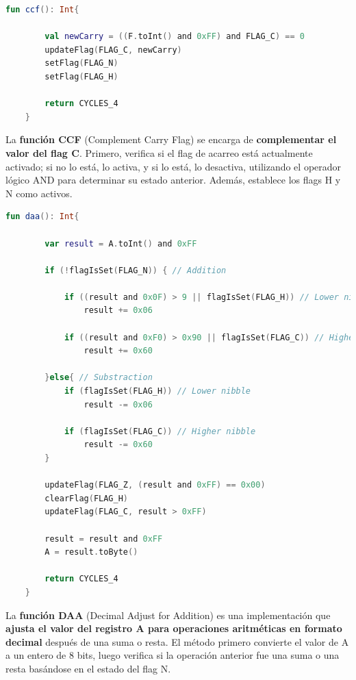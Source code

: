 \begin{lstlisting}[language=Kotlin, caption={Operación CCF}, label={code:kotlinccf}]
    fun ccf(): Int{

        val newCarry = ((F.toInt() and 0xFF) and FLAG_C) == 0
        updateFlag(FLAG_C, newCarry)
        setFlag(FLAG_N)
        setFlag(FLAG_H)

        return CYCLES_4
    }
\end{lstlisting}

La \textbf{función CCF} (Complement Carry Flag) se encarga de \textbf{complementar el valor del flag C}. Primero, verifica si el flag de acarreo está actualmente activado; si no lo está, lo activa, y si lo está, lo desactiva, utilizando el operador lógico AND para determinar su estado anterior. Además, establece los flags H y N como activos.

\begin{lstlisting}[language=Kotlin, caption={Operación DAA}, label={code:kotlindaa}]
    fun daa(): Int{

        var result = A.toInt() and 0xFF

        if (!flagIsSet(FLAG_N)) { // Addition

            if ((result and 0x0F) > 9 || flagIsSet(FLAG_H)) // Lower nibble
                result += 0x06

            if ((result and 0xF0) > 0x90 || flagIsSet(FLAG_C)) // Higher nibble
                result += 0x60

        }else{ // Substraction
            if (flagIsSet(FLAG_H)) // Lower nibble
                result -= 0x06

            if (flagIsSet(FLAG_C)) // Higher nibble
                result -= 0x60
        }

        updateFlag(FLAG_Z, (result and 0xFF) == 0x00)
        clearFlag(FLAG_H)
        updateFlag(FLAG_C, result > 0xFF)

        result = result and 0xFF
        A = result.toByte()

        return CYCLES_4
    }
\end{lstlisting}

La \textbf{función DAA} (Decimal Adjust for Addition) es una implementación que \textbf{ajusta el valor del registro A para operaciones aritméticas en formato decimal} después de una suma o resta. El método primero convierte el valor de A a un entero de 8 bits, luego verifica si la operación anterior fue una suma o una resta basándose en el estado del flag N.

